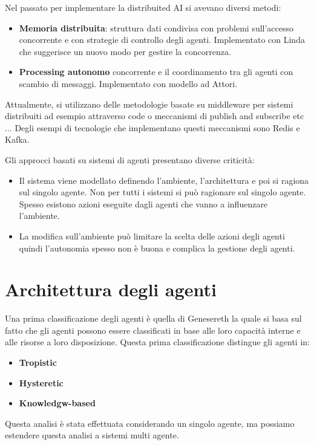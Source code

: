 Nel passato per implementare la distribuited AI si avevano diversi metodi:
\begin{itemize}
    \item \textbf{Memoria distribuita}: struttura dati condivisa con problemi
          sull'accesso concorrente e con strategie di controllo degli agenti.
          Implementato con Linda che suggerisce un nuovo modo per gestire la
          concorrenza.
    \item \textbf{Processing autonomo} concorrente e il coordinamento tra gli
          agenti con scambio di messaggi. Implementato con modello ad Attori.
\end{itemize}
Attualmente, si utilizzano delle metodologie basate su middleware per sistemi
distribuiti ad esempio attraverso code o meccanismi di publish and subscribe
etc$\dots$ Degli esempi di tecnologie che implementano questi meccanismi sono
Redis e Kafka.

Gli approcci basati su sistemi di agenti presentano diverse criticità:
\begin{itemize}
    \item Il sistema viene modellato definendo l'ambiente, l'architettura e poi
          si ragiona sul singolo agente. Non per tutti i sistemi si può ragionare
          sul singolo agente. Spesso esistono azioni eseguite dagli agenti che
          vanno a influenzare l'ambiente.
    \item La modifica sull'ambiente può limitare la scelta delle azioni degli
          agenti quindi l'autonomia spesso non è buona e complica la gestione
          degli agenti.
\end{itemize}
\section{Architettura degli agenti}
Una prima classificazione degli agenti è quella di Genesereth la quale si basa
sul fatto che gli agenti possono essere classificati in base alle loro capacità
interne e alle risorse a loro disposizione. Questa prima classificazione
distingue gli agenti in:
\begin{itemize}
    \item \textbf{Tropistic}
    \item \textbf{Hysteretic}
    \item \textbf{Knowledgw-based}
\end{itemize}
\begin{nota}
    Questa analisi è stata effettuata considerando un singolo agente, ma
    possiamo estendere questa analisi a sistemi multi agente.
\end{nota}
